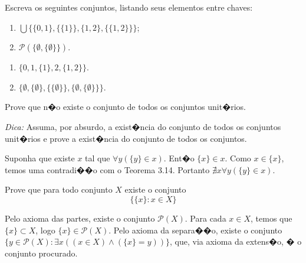 \begin{exercicio}
	Escreva os seguintes conjuntos, listando seus elementos entre chaves:
	\begin{enumerate}[label=(\alph{*})]
		\item $\bigcup\{\{0,1\},\{\{1\}\},\{1,2\},\{\{1,2\}\}\}$;
		\item $\mathcal{P}(\{\emptyset,\{\emptyset\}\})$.
	\end{enumerate}
\end{exercicio}
\begin{solucao}
	\begin{enumerate}[label=(\alph{*})]
		\item $\{0,1,\{1\},2,\{1,2\}\}$.
		\item $\{\emptyset,\{\emptyset\},\{\{\emptyset\}\},\{\emptyset,\{\emptyset\}\}\}$.
	\end{enumerate}
\end{solucao}

\begin{exercicio}
	Prove que n�o existe o conjunto de todos os conjuntos unit�rios.
	
	\emph{Dica:} Assuma, por absurdo, a exist�ncia do conjunto de todos os conjuntos unit�rios e prove a exist�ncia do conjunto de todos os conjuntos.
\end{exercicio}
\begin{solucao}
	Suponha que existe $x$ tal que $\forall y(\{y\}\in x)$. Ent�o $\{x\}\in x$. Como $x\in\{x\}$, temos uma contradi��o com o Teorema 3.14. Portanto $\nexists x\forall y(\{y\}\in x)$.
\end{solucao}

\begin{exercicio}
	Prove que para todo conjunto $X$ existe o conjunto
	$$\{\{x\}:x\in X\}$$
\end{exercicio}
\begin{solucao}
	Pelo axioma das partes, existe o conjunto $\mathcal{P}(X)$. Para cada $x\in X$, temos que $\{x\}\subset X$, logo $\{x\}\in\mathcal{P}(X)$. Pelo axioma da separa��o, existe o conjunto $\{y\in \mathcal{P}(X):\exists x((x\in X)\wedge(\{x\}=y))\}$, que, via axioma da extens�o, � o conjunto procurado.
\end{solucao}

